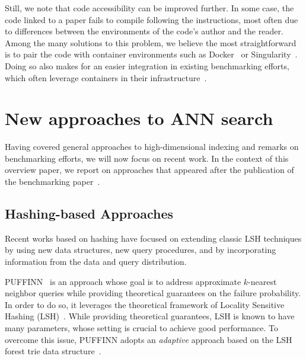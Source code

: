 \documentclass[11pt]{article}
\begin{document}
Still, we note that code accessibility can be improved further. In some case,
the code linked to a paper fails to compile following the instructions, most
often due to differences between the environments of the code's author and the
reader. Among the many solutions to this problem, we believe the most
straightforward is to pair the code with container environments such as
Docker~\cite{DBLP:journals/sigops/Boettiger15} or
Singularity~\cite{singularity}. Doing so also makes for an easier integration
in existing benchmarking efforts, which often leverage containers in their
infrastructure~\cite{DBLP:journals/is/AumullerBF20}.

\section{New approaches to ANN search}
\label{matteo_sec:new:approaches}

Having covered general approaches to high-dimensional indexing and remarks on benchmarking efforts, we will now focus on recent work.
In the context of this overview paper, we report on approaches that appeared after the publication of the benchmarking paper~\cite{DBLP:journals/is/AumullerBF20}.

\subsection{Hashing-based Approaches}

Recent works based on hashing have focused on extending classic LSH techniques
by using new data structures, new query procedures, and by incorporating
information from the data and query distribution.

\textsc{PUFFINN}~\cite{DBLP:conf/esa/0001CPV19} is an approach whose goal
is to address approximate $k$-nearest neighbor queries while providing theoretical
guarantees on the failure probability. In order to do so, it leverages
the theoretical framework of Locality Sensitive Hashing
(LSH)~\cite{DBLP:conf/sequences/Broder97,DBLP:journals/toc/Har-PeledIM12}.
While providing theoretical
guarantees, LSH is known to have many parameters, whose setting is
crucial to achieve good performance. To overcome this issue,
\textsc{PUFFINN} adopts an \emph{adaptive} approach based on the LSH forest trie data structure~\cite{DBLP:conf/www/BawaCG05}.
\end{document}
